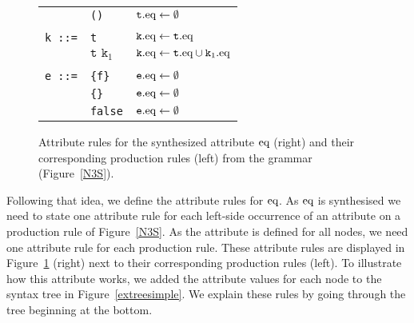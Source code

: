 \begin{figure}
\begin{tabular}{lll}
      & \texttt{()}& $\texttt{t}.\text{eq} \leftarrow\emptyset$\\
      &&\\
\texttt{k ::=}& \texttt{t}& $\texttt{k}.\text{eq} \leftarrow\texttt{t}.\text{eq}$\\
&$\texttt{t k}_1$ & $\texttt{k}.\text{eq} \leftarrow\texttt{t}.\text{eq}\cup\texttt{k}_1.\text{eq}$\\
&&\\
\texttt{e ::=}&\texttt{\{f\}} &                $\texttt{e}.\text{eq} \leftarrow\emptyset$\\
       &\texttt{\{\}} &  $\texttt{e}.\text{eq} \leftarrow\emptyset$\\
       &\texttt{false}       &                $\texttt{e}.\text{eq} \leftarrow\emptyset$\\
  \hline
\end{tabular}
\caption{Attribute rules for the synthesized attribute $\text{eq}$ (right) and their corresponding production rules (left) from the \nthree grammar (Figure~\ref{N3S}).\label{EQ}}
\end{figure}
%
%

Following that idea, we define the attribute rules for $\text{eq}$.
As $\text{eq}$ is synthesised %
we need to state one attribute rule  for each left-side occurrence of an attribute on a production rule of Figure~\ref{N3S}. 
As the attribute is defined for all nodes, we need one attribute rule for each production rule.
% 
% 
% 
% 
% 
These attribute rules are displayed in Figure~\ref{EQ} (right) next to their corresponding production rules (left). 
To illustrate how this attribute works, we added the attribute values for each node to the syntax tree in Figure~\ref{extreesimple}.
We explain these rules by going through the tree %
beginning at the bottom.

